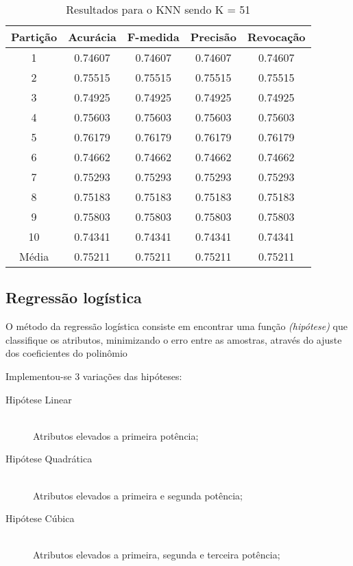 \begin{table}[h]
\centering
\caption{Resultados para o KNN sendo K = 51}
\vspace{0.2cm}
\begin{tabular}{c|c|c|c|c}
Partição & Acurácia & F-medida & Precisão & Revocação \\
\hline
1  & 0.74607 & 0.74607 & 0.74607 & 0.74607 \\     
2  & 0.75515 & 0.75515 & 0.75515 & 0.75515 \\     
3  & 0.74925 & 0.74925 & 0.74925 & 0.74925 \\     
4  & 0.75603 & 0.75603 & 0.75603 & 0.75603 \\     
5  & 0.76179 & 0.76179 & 0.76179 & 0.76179 \\     
6  & 0.74662 & 0.74662 & 0.74662 & 0.74662 \\     
7  & 0.75293 & 0.75293 & 0.75293 & 0.75293 \\     
8  & 0.75183 & 0.75183 & 0.75183 & 0.75183 \\     
9  & 0.75803 & 0.75803 & 0.75803 & 0.75803 \\     
10 & 0.74341 & 0.74341 & 0.74341 & 0.74341 \\
\hline
Média & 0.75211 & 0.75211 & 0.75211 & 0.75211  

\end{tabular} 
\label{table:resultadosKNN}
\end{table}

\subsection{Regressão logística}

O método da regressão logística consiste em encontrar uma função \emph{(hipótese)} que classifique os atributos, minimizando o erro entre as amostras, através do ajuste dos coeficientes do polinômio %

Implementou-se 3 variações das hipóteses:

\begin{description}
\item[Hipótese Linear] \hfill \\ Atributos elevados a primeira potência;
\item[Hipótese Quadrática] \hfill \\ Atributos elevados a primeira e segunda potência;
\item[Hipótese Cúbica] \hfill \\ Atributos elevados a primeira, segunda e terceira potência;
\end{description}

